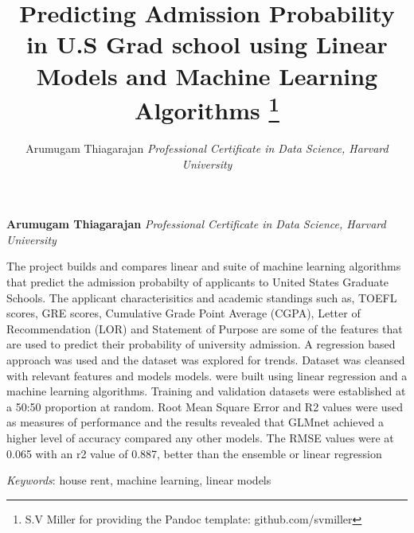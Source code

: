 \documentclass[11pt,]{article}
\title{Predicting Admission Probability in U.S Grad school using Linear Models
and Machine Learning Algorithms \thanks{S.V Miller for providing the Pandoc template: github.com/svmiller}  }
\author{\Large Arumugam Thiagarajan\vspace{0.05in} \newline\normalsize\emph{Professional Certificate in Data Science, Harvard University}  }
\date{}
\newcommand*{\authorfont}{\fontfamily{phv}\selectfont}
\renewenvironment{abstract}
 {{%
    \setlength{\leftmargin}{0mm}
    \setlength{\rightmargin}{\leftmargin}%
  }%
  \relax}
 {\endlist}
\begin{document}
	
%

{%
\setlength{\parindent}{0pt}
\thispagestyle{plain}
{\fontsize{18}{20}\selectfont\raggedright 
\maketitle  %

}

{
   \vskip 13.5pt\relax \normalsize\fontsize{11}{12} 
\textbf{\authorfont Arumugam Thiagarajan} \hskip 15pt \emph{\small Professional Certificate in Data Science, Harvard University}   

}

}








\begin{abstract}

    \hbox{\vrule height .2pt width 39.14pc}

    \vskip 8.5pt %

\noindent The project builds and compares linear and suite of machine learning
algorithms that predict the admission probabilty of applicants to United
States Graduate Schools. The applicant characterisitics and academic
standings such as, TOEFL scores, GRE scores, Cumulative Grade Point
Average (CGPA), Letter of Recommendation (LOR) and Statement of Purpose
are some of the features that are used to predict their probability of
university admission. A regression based approach was used and the
dataset was explored for trends. Dataset was cleansed with relevant
features and models models. were built using linear regression and a
machine learning algorithms. Training and validation datasets were
established at a 50:50 proportion at random. Root Mean Square Error and
R2 values were used as measures of performance and the results revealed
that GLMnet achieved a higher level of accuracy compared any other
models. The RMSE values were at 0.065 with an r2 value of 0.887, better
than the ensemble or linear regression


\vskip 8.5pt \noindent \emph{Keywords}: house rent, machine learning, linear models \par

    \hbox{\vrule height .2pt width 39.14pc}



\end{abstract}
\end{document}
